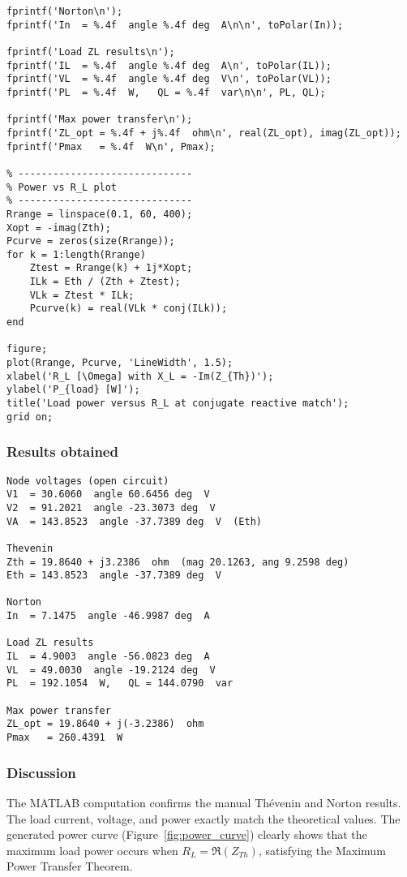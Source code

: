 \documentclass[a4paper,12pt]{article}
\begin{document}
\begin{verbatim}
fprintf('Norton\n');
fprintf('In  = %.4f  angle %.4f deg  A\n\n', toPolar(In));

fprintf('Load ZL results\n');
fprintf('IL  = %.4f  angle %.4f deg  A\n', toPolar(IL));
fprintf('VL  = %.4f  angle %.4f deg  V\n', toPolar(VL));
fprintf('PL  = %.4f  W,   QL = %.4f  var\n\n', PL, QL);

fprintf('Max power transfer\n');
fprintf('ZL_opt = %.4f + j%.4f  ohm\n', real(ZL_opt), imag(ZL_opt));
fprintf('Pmax   = %.4f  W\n', Pmax);

% ------------------------------
% Power vs R_L plot
% ------------------------------
Rrange = linspace(0.1, 60, 400);
Xopt = -imag(Zth);
Pcurve = zeros(size(Rrange));
for k = 1:length(Rrange)
    Ztest = Rrange(k) + 1j*Xopt;
    ILk = Eth / (Zth + Ztest);
    VLk = Ztest * ILk;
    Pcurve(k) = real(VLk * conj(ILk));
end

figure;
plot(Rrange, Pcurve, 'LineWidth', 1.5);
xlabel('R_L [\Omega] with X_L = -Im(Z_{Th})');
ylabel('P_{load} [W]');
title('Load power versus R_L at conjugate reactive match');
grid on;
\end{verbatim}

\subsubsection*{Results obtained}

\begin{verbatim}
Node voltages (open circuit)
V1  = 30.6060  angle 60.6456 deg  V
V2  = 91.2021  angle -23.3073 deg  V
VA  = 143.8523  angle -37.7389 deg  V  (Eth)

Thevenin
Zth = 19.8640 + j3.2386  ohm  (mag 20.1263, ang 9.2598 deg)
Eth = 143.8523  angle -37.7389 deg  V

Norton
In  = 7.1475  angle -46.9987 deg  A

Load ZL results
IL  = 4.9003  angle -56.0823 deg  A
VL  = 49.0030  angle -19.2124 deg  V
PL  = 192.1054  W,   QL = 144.0790  var

Max power transfer
ZL_opt = 19.8640 + j(-3.2386)  ohm
Pmax   = 260.4391  W
\end{verbatim}

\subsubsection*{Discussion}
The MATLAB computation confirms the manual Thévenin and Norton results.  
The load current, voltage, and power exactly match the theoretical values.  
The generated power curve (Figure~\ref{fig:power_curve}) clearly shows that 
the maximum load power occurs when \( R_L = \Re(Z_{Th}) \), satisfying the 
Maximum Power Transfer Theorem.
\end{document}
